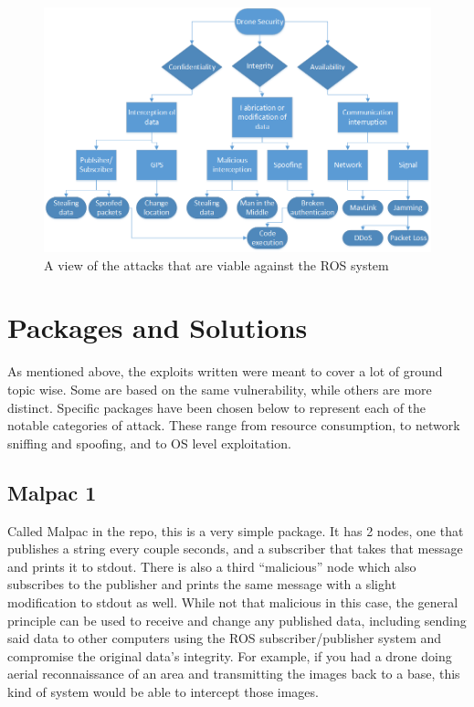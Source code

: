 \documentclass[IEEEtran,letterpaper,10pt,notitlepage,draftclsnofoot,onecolumn]{article}
\begin{document}
\begin{figure}[H]
    \centering
    \includegraphics[width=\textwidth]{model}
    \caption{A view of the attacks that are viable against the ROS system}
\end{figure}

\section{Packages and Solutions}
As mentioned above, the exploits written were meant to cover a lot of ground topic wise.
Some are based on the same vulnerability, while others are more distinct.
Specific packages have been chosen below to represent each of the notable categories of attack.
These range from resource consumption, to network sniffing and spoofing, and to OS level exploitation.

\subsection{Malpac 1}
Called Malpac in the repo, this is a very simple package. It has 2 nodes, one that publishes a string every couple seconds, and a subscriber that takes that message and prints it to stdout.
There is also a third “malicious” node which also subscribes to the publisher and prints the same message with a slight modification to stdout as well.
While not that malicious in this case, the general principle can be used to receive and change any published data, including sending said data to other computers using the ROS subscriber/publisher system and compromise the original data’s integrity.
For example, if you had a drone doing aerial reconnaissance of an area and transmitting the images back to a base, this kind of system would be able to intercept those images.
\end{document}
